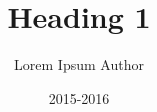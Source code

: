 \documentclass[11pt, a4paper, oneside]{book}
\title{Heading 1}
\date{2015-2016}
\author{Lorem Ipsum Author}
\begin{document}
	\begin{titlepage}
	\end{titlepage}
\end{document}
